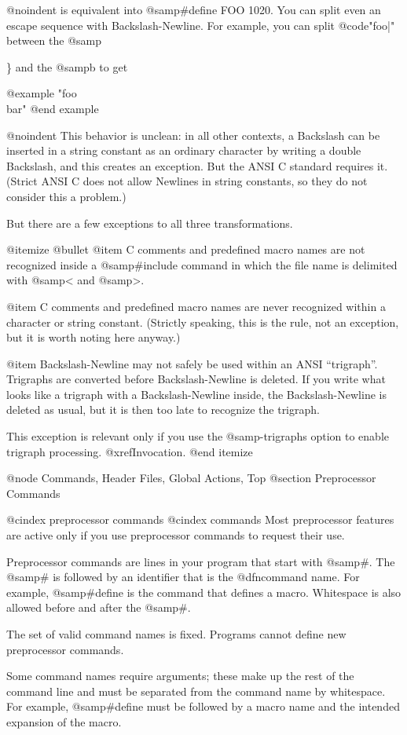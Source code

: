 @noindent
is equivalent into @samp{#define FOO 1020}.  You can split even an escape
sequence with Backslash-Newline.  For example, you can split @code{"foo\bar"}
between the @samp{\} and the @samp{b} to get

@example
"foo\\
bar"
@end example

@noindent
This behavior is unclean: in all other contexts, a Backslash can be
inserted in a string constant as an ordinary character by writing a double
Backslash, and this creates an exception.  But the ANSI C standard requires
it.  (Strict ANSI C does not allow Newlines in string constants, so they
do not consider this a problem.)

But there are a few exceptions to all three transformations.

@itemize @bullet
@item
C comments and predefined macro names are not recognized inside a
@samp{#include} command in which the file name is delimited with
@samp{<} and @samp{>}.

@item
C comments and predefined macro names are never recognized within a
character or string constant.  (Strictly speaking, this is the rule,
not an exception, but it is worth noting here anyway.)

@item
Backslash-Newline may not safely be used within an ANSI ``trigraph''.
Trigraphs are converted before Backslash-Newline is deleted.  If you
write what looks like a trigraph with a Backslash-Newline inside, the
Backslash-Newline is deleted as usual, but it is then too late to
recognize the trigraph.

This exception is relevant only if you use the @samp{-trigraphs}
option to enable trigraph processing.  @xref{Invocation}.
@end itemize

@node Commands, Header Files, Global Actions, Top
@section Preprocessor Commands

@cindex preprocessor commands
@cindex commands
Most preprocessor features are active only if you use preprocessor commands
to request their use.

Preprocessor commands are lines in your program that start with @samp{#}.
The @samp{#} is followed by an identifier that is the @dfn{command name}.
For example, @samp{#define} is the command that defines a macro.
Whitespace is also allowed before and after the @samp{#}.

The set of valid command names is fixed.  Programs cannot define new
preprocessor commands.

Some command names require arguments; these make up the rest of the command
line and must be separated from the command name by whitespace.  For example,
@samp{#define} must be followed by a macro name and the intended expansion
of the macro.

}
